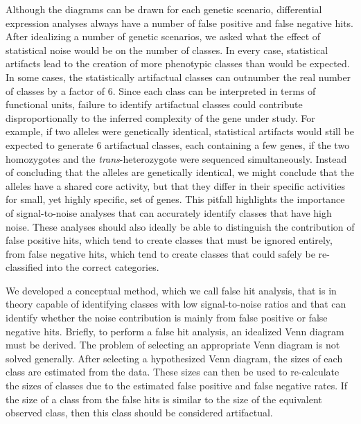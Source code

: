 \documentclass[10pt, twocolumn]{article}
\begin{document}
Although the diagrams can be drawn for each genetic scenario, differential
expression analyses always have a number of false positive and false negative
hits. After idealizing a number of genetic scenarios, we asked what the effect
of statistical noise would be on the number of classes. In every case,
statistical artifacts lead to the creation of more phenotypic classes than would
be expected. In some cases, the statistically artifactual classes can outnumber
the real number of classes by a factor of 6. Since each class can be interpreted
in terms of functional units, failure to identify artifactual classes could
contribute disproportionally to the inferred complexity of the gene under study.
For example, if two alleles were genetically identical, statistical artifacts
would still be expected to generate 6 artifactual classes, each containing a
few genes, if the two homozygotes and the \emph{trans}-heterozygote were
sequenced simultaneously. Instead of concluding that the alleles are genetically
identical, we might conclude that the alleles have a shared core activity, but
that they differ in their specific activities for small, yet highly specific,
set of genes. This pitfall highlights the importance of signal-to-noise analyses
that can accurately identify classes that have high noise. These analyses should
also ideally be able to distinguish the contribution of false positive hits,
which tend to create classes that must be ignored entirely, from false negative
hits, which tend to create classes that could safely be re-classified into
the correct categories.

We developed a conceptual method, which we call false hit analysis, that is
in theory capable of identifying classes with low signal-to-noise ratios and
that can identify whether the noise contribution is mainly from false positive
or false negative hits. Briefly, to perform a false hit analysis, an idealized
Venn diagram must be derived. The problem of selecting an appropriate Venn
diagram is not solved generally. After selecting a hypothesized Venn diagram,
the sizes of each class are estimated from the data. These sizes can then be
used to re-calculate the sizes of classes due to the estimated false positive
and false negative rates. If the size of a class from the false hits is
similar to the size of the equivalent observed class, then this class should be
considered artifactual.
\end{document}
